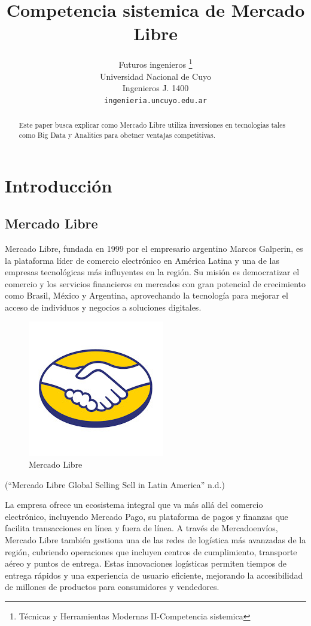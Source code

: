 \documentclass{article}
\title{Competencia sistemica de Mercado Libre}
\author{
    Futuros ingenieros
    \thanks{Técnicas y Herramientas Modernas II-Competencia sistemica}
   \\
    Universidad Nacional de Cuyo \\
  Ingenieros J. 1400 \\
  \texttt{ingenieria.uncuyo.edu.ar} \\
  }
\begin{document}
\maketitle


\begin{abstract}
Este paper busca explicar como Mercado Libre utiliza inversiones en
tecnologias tales como Big Data y Analitics para obetner ventajas
competitivas.
\end{abstract}


\pagebreak

\section{Introducción}\label{introducciuxf3n}

\subsection{Mercado Libre}\label{mercado-libre}

Mercado Libre, fundada en 1999 por el empresario argentino Marcos
Galperin, es la plataforma líder de comercio electrónico en América
Latina y una de las empresas tecnológicas más influyentes en la región.
Su misión es democratizar el comercio y los servicios financieros en
mercados con gran potencial de crecimiento como Brasil, México y
Argentina, aprovechando la tecnología para mejorar el acceso de
individuos y negocios a soluciones digitales.

\begin{figure}[b]
\centering
\includegraphics{ML.jpg}
\caption{Mercado Libre}
\end{figure}

({``Mercado {Libre} {Global} {Selling} {\textbar} {Sell} in {Latin}
{America}''} n.d.)

La empresa ofrece un ecosistema integral que va más allá del comercio
electrónico, incluyendo Mercado Pago, su plataforma de pagos y finanzas
que facilita transacciones en línea y fuera de línea. A través de
Mercadoenvíos, Mercado Libre también gestiona una de las redes de
logística más avanzadas de la región, cubriendo operaciones que incluyen
centros de cumplimiento, transporte aéreo y puntos de entrega. Estas
innovaciones logísticas permiten tiempos de entrega rápidos y una
experiencia de usuario eficiente, mejorando la accesibilidad de millones
de productos para consumidores y vendedores.
\end{document}
